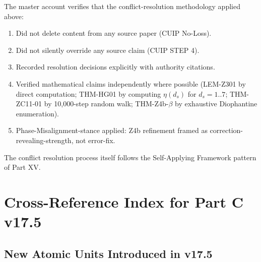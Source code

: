 \documentclass[12pt, a4paper]{article}
\begin{document}
\begin{formalbox}[title={Self-audit of conflict resolution}]
The master account verifies that the conflict-resolution methodology
applied above:
\begin{enumerate}[leftmargin=*, noitemsep]
  \item Did not delete content from any source paper (CUIP No-Loss).
  \item Did not silently override any source claim (CUIP STEP 4).
  \item Recorded resolution decisions explicitly with authority citations.
  \item Verified mathematical claims independently where possible
    (LEM-Z301 by direct computation; THM-HG01 by computing $\eta(d_s)$
    for $d_s = 1..7$; THM-ZC11-01 by 10{,}000-step random walk;
    THM-Z4b-$\beta$ by exhaustive Diophantine enumeration).
  \item Phase-Misalignment-stance applied: Z4b refinement framed as
    correction-revealing-strength, not error-fix.
\end{enumerate}
The conflict resolution process itself follows the Self-Applying
Framework pattern of Part XV.
\end{formalbox}

\section{Cross-Reference Index for Part C v17.5}
\label{sec:cross-ref-index}

\subsection{New Atomic Units Introduced in v17.5}
\end{document}

